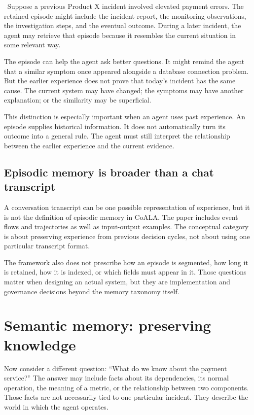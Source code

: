 \BookExampleLabel\ Suppose a previous Product X incident involved elevated payment errors. The retained episode might include the incident report, the monitoring observations, the investigation steps, and the eventual outcome. During a later incident, the agent may retrieve that episode because it resembles the current situation in some relevant way.

The episode can help the agent ask better questions. It might remind the agent that a similar symptom once appeared alongside a database connection problem. But the earlier experience does not prove that today's incident has the same cause. The current system may have changed; the symptoms may have another explanation; or the similarity may be superficial.

This distinction is especially important when an agent uses past experience. An episode supplies historical information. It does not automatically turn its outcome into a general rule. The agent must still interpret the relationship between the earlier experience and the current evidence.

\subsection{Episodic memory is broader than a chat transcript}

A conversation transcript can be one possible representation of experience, but it is not the definition of episodic memory in CoALA. The paper includes event flows and trajectories as well as input-output examples. The conceptual category is about preserving experience from previous decision cycles, not about using one particular transcript format.

The framework also does not prescribe how an episode is segmented, how long it is retained, how it is indexed, or which fields must appear in it. Those questions matter when designing an actual system, but they are implementation and governance decisions beyond the memory taxonomy itself.

\section{Semantic memory: preserving knowledge}
\label{sec:semantic-memory}

Now consider a different question: ``What do we know about the payment service?'' The answer may include facts about its dependencies, its normal operation, the meaning of a metric, or the relationship between two components. Those facts are not necessarily tied to one particular incident. They describe the world in which the agent operates.

